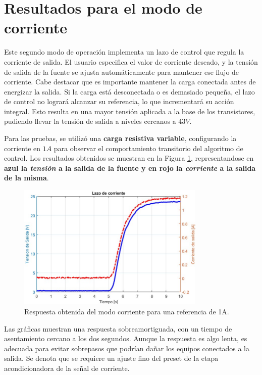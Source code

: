 \section{Resultados para el modo de corriente} \label{S:subseccion de corriente}
Este segundo modo de operación implementa un lazo de control que regula la corriente de salida. El usuario especifica el valor de corriente deseado, y la tensión de salida de la fuente se ajusta automáticamente para mantener ese flujo de corriente. Cabe destacar que es importante mantener la carga conectada antes de energizar la salida. Si la carga está desconectada o es demasiado pequeña, el lazo de control no logrará alcanzar su referencia, lo que incrementará su acción integral. Esto resulta en una mayor tensión aplicada a la base de los transistores, pudiendo llevar la tensión de salida a niveles cercanos a $43V$. \par 
Para las pruebas, se utilizó una \textbf{carga resistiva variable}, configurando la corriente en $1A$ para observar el comportamiento transitorio del algoritmo de control. Los resultados obtenidos se muestran en la Figura \ref{F:Lcorriente1}, representandose en \textbf{\textbf{azul} la \textit{tensión} a la salida de la fuente y en \textbf{rojo} la \textit{corriente} a la salida de la misma}.
\begin{figure}[H]
    \centering
    \includegraphics[width=0.8\textwidth]{./imagenes/LazoCorriente.jpg}
    \caption{Respuesta obtenida del modo corriente para una referencia de 1A.}
    \label{F:Lcorriente1}
\end{figure} \par 
Las gráficas muestran una respuesta sobreamortiguada, con un tiempo de asentamiento cercano a los dos segundos. Aunque la respuesta es algo lenta, es adecuada para evitar sobrepasos que podrían dañar los equipos conectados a la salida. Se denota que se requiere un ajuste fino del preset de la etapa acondicionadora de la señal de corriente. \par

